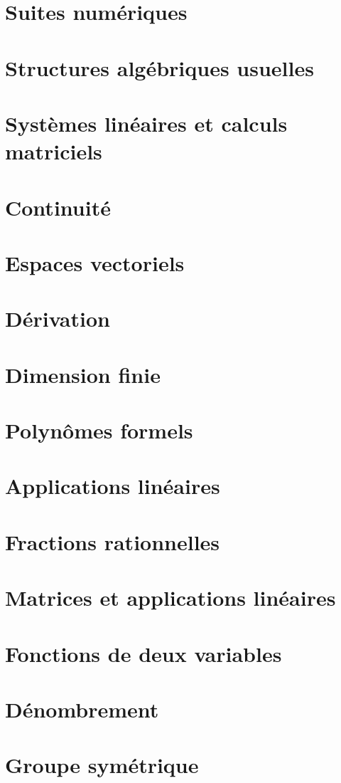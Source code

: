 \documentclass[a4paper]{report}
\newcommand{\chap}[2][0]{
    \setcounter{chapter}{#1 - 1}
    \chapter{#2}
    \renewcommand*\parttitle{#2}
}
\begin{document}
	\chap[11]{Suites numériques}
	\renewcommand{\cwd}{../chap11}
	
	
	
	
	
	
	
	

	\chap[12]{Structures algébriques usuelles}
	\renewcommand{\cwd}{../chap12}
	
	
	
	

	\chap[13]{Systèmes linéaires et calculs matriciels}
	\renewcommand{\cwd}{../chap13}
	

	\chap[14]{Continuité}
	\renewcommand{\cwd}{../chap14}
	
	
	
	

	\chap[15]{Espaces vectoriels}
	\renewcommand{\cwd}{../chap15}
	
	
	

	\chap[16]{Dérivation}
	\renewcommand{\cwd}{../chap16}
	
	
	
	

	\chap[17]{Dimension finie}
	\renewcommand{\cwd}{../chap17}
	

	\chap[18]{Polynômes formels}
	\renewcommand{\cwd}{../chap18}
	
	
	
	

	\chap[19]{Applications linéaires}
	\renewcommand{\cwd}{../chap19}
	
	
	
	
	

	\chap[20]{Fractions rationnelles}
	\renewcommand{\cwd}{../chap20}
	
	

	\chap[21]{Matrices et applications linéaires}
	\renewcommand{\cwd}{../chap21}
	
	
	
	
	
	

	\chap[22]{Fonctions de deux variables}
	\renewcommand{\cwd}{../chap22}
	
	
	

	\chap[23]{Dénombrement}
	\renewcommand{\cwd}{../chap23}
	
	
	

	\chap[24]{Groupe symétrique}
	\renewcommand{\cwd}{../chap24}
	
	
	
	
\end{document}
